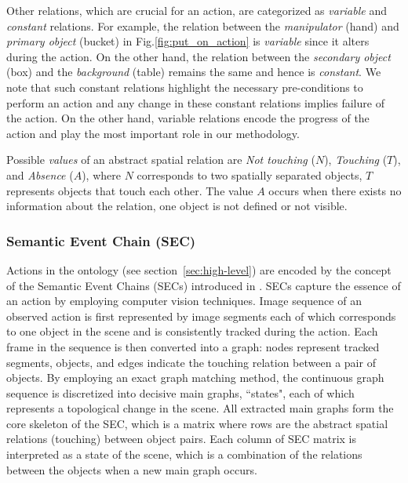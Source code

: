 Other relations, which are crucial for an action, are categorized as \emph{variable} and \emph{constant} relations.
For example, the relation between the {\it manipulator} (\ie hand) and {\it primary object} (\ie bucket) in Fig.\ref{fig:put_on_action} is \emph{variable} since it alters during the action. On the other hand,
the relation between the  {\it secondary object} (\ie box) and the  {\it background} (\ie table) remains the same and hence is \emph{constant}.
We note that such constant relations highlight the necessary pre-conditions to perform an action and any change in these constant relations implies failure of the action.
On the other hand, variable relations encode the progress of the action and play the most important role in our methodology.

Possible  \emph{values} of an abstract spatial relation are {\it Not touching} ($N$), {\it Touching} ($T$), and {\it Absence} ($A$), where $N$ corresponds to two spatially separated objects, $T$ represents objects that touch each other.  The  value $A$ occurs when there exists no information about the relation, \eg one object is not defined or not visible.
 


\subsubsection{Semantic Event Chain (SEC)}
\label{sec:SEC}

Actions in the ontology (see section~\ref{sec:high-level}) are encoded by  the concept of the Semantic Event Chains (SECs) introduced in \cite{Aksoy2011}. 
SECs capture the essence of an action by employing computer vision techniques. Image sequence of an observed action is first represented by image segments each of which corresponds to one object in the scene and is consistently tracked during the action. Each frame in the sequence is then converted into a graph: nodes represent tracked segments, \ie objects, and edges indicate the touching relation between a pair of objects.  	
By employing an exact graph matching method, the continuous graph sequence is discretized into decisive main graphs, \ie ``states", each of which represents a topological change in the scene. 
All extracted main graphs form the core skeleton of the SEC, which is a matrix where rows are the abstract spatial relations (\eg touching) between object pairs.
Each column of SEC matrix is interpreted as a state of the scene, which is a combination of the relations between the objects when a new main graph occurs. 


